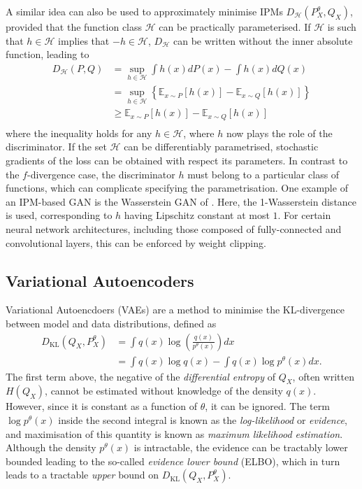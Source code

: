 A similar idea can also be used to approximately minimise IPMs $D_\mathcal{H}(P^\theta_X, Q_X)$, provided that the function class $\mathcal{H}$ can be practically parameterised.
If $\mathcal{H}$ is such that $h \in \mathcal{H}$ implies that $-h \in \mathcal{H}$, $D_\mathcal{H}$ can be written without the inner absolute function, leading to
%
\begin{align*}
D_{\mathcal{H}}(P, Q) &= \sup_{h\in\mathcal{H}} \int h(x) dP(x) - \int h(x) dQ(x) \\
&= \sup_{h\in\mathcal{H}} \left\{ \mathbb{E}_{x \sim P} \left[ h(x) \right]- \mathbb{E}_{x \sim Q} \left[ h(x) \right] \right\} \\
&\geq  \mathbb{E}_{x \sim P} \left[ h(x) \right]- \mathbb{E}_{x \sim Q} \left[ h(x) \right] \\
\end{align*}
%
where the inequality holds for any $h \in \mathcal{H}$, where $h$ now plays the role of the discriminator. 
If the set $\mathcal{H}$ can be differentiably parametrised, stochastic gradients of the loss can be obtained with respect its parameters.
In contrast to the $f$-divergence case, the discriminator $h$ must belong to a particular class of functions, which can complicate specifying the parametrisation.
One example of an IPM-based GAN is the Wasserstein GAN of \cite{AB17}. 
Here, the 1-Wasserstein distance is used, corresponding to $h$ having Lipschitz constant at most $1$. 
For certain neural network architectures, including those composed of fully-connected and convolutional layers, this can be enforced by weight clipping.

\subsection{Variational Autoencoders}

Variational Autoencdoers (VAEs) \citep{kingma2013auto, rezende2014stochastic} are a method to minimise the KL-divergence between model and data distributions, defined as
%
\begin{align*}
D_{\text{KL}}(Q_X, P^\theta_X) &= \int q(x) \log \left( \frac{q(x)}{p^\theta(x)} \right) dx \\
&= \int q(x) \log q(x) - \int q(x) \log p^\theta(x) dx.
\end{align*}
%
The first term above, the negative of the \emph{differential entropy} of $Q_X$, often written $H(Q_X)$, cannot be estimated without knowledge of the density $q(x)$.
However, since it is constant as a function of $\theta$, it can be ignored.
The term $\log p^\theta(x)$ inside the second integral is known as the \emph{log-likelihood} or \emph{evidence}, and maximisation of this quantity is known as \emph{maximum likelihood estimation}. 
Although the density $p^\theta(x)$ is intractable, the evidence can be tractably lower bounded leading to the so-called \emph{evidence lower bound} (ELBO), which in turn leads to a tractable \emph{upper} bound on $D_{\text{KL}}(Q_X, P^\theta_X)$. 

